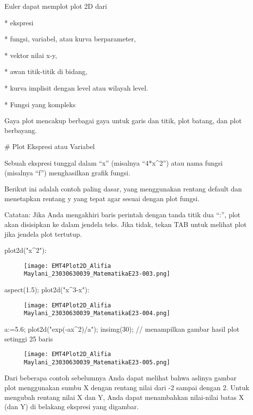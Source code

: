 \documentclass{article}
\begin{document}
Euler dapat memplot plot 2D dari


* 
ekspresi

* 
fungsi, variabel, atau kurva berparameter,

* 
vektor nilai x-y,

* 
awan titik-titik di bidang,

* 
kurva implisit dengan level atau wilayah level.

* 
Fungsi yang kompleks


Gaya plot mencakup berbagai gaya untuk garis dan titik, plot batang,
dan plot berbayang.


# Plot Ekspresi atau Variabel

Sebuah ekspresi tunggal dalam “x” (misalnya “4*x^2”) atau nama fungsi
(misalnya “f”) menghasilkan grafik fungsi.


Berikut ini adalah contoh paling dasar, yang menggunakan rentang
default dan menetapkan rentang y yang tepat agar sesuai dengan plot
fungsi.


Catatan: Jika Anda mengakhiri baris perintah dengan tanda titik dua
“:”, plot akan disisipkan ke dalam jendela teks. Jika tidak, tekan TAB
untuk melihat plot jika jendela plot tertutup.


\>plot2d("x^2"):


\begin{figure}
    \centering
    \texttt{[image: EMT4Plot2D\_Alifia Maylani\_23030630039\_MatematikaE23-003.png]}
    \caption{}
    \label{fig:enter-label}
\end{figure}

\>aspect(1.5); plot2d("x^3-x"):


\begin{figure}
    \centering
    \texttt{[image: EMT4Plot2D\_Alifia Maylani\_23030630039\_MatematikaE23-004.png]}
    \caption{}
    \label{fig:enter-label}
\end{figure}

\>a:=5.6; plot2d("exp(-a\*x^2)/a"); insimg(30); // menampilkan gambar hasil plot setinggi 25 baris


\begin{figure}
    \centering
    \texttt{[image: EMT4Plot2D\_Alifia Maylani\_23030630039\_MatematikaE23-005.png]}
    \caption{}
    \label{fig:enter-label}
\end{figure}

Dari beberapa contoh sebelumnya Anda dapat melihat bahwa aslinya
gambar plot menggunakan sumbu X dengan rentang nilai dari -2 sampai
dengan 2. Untuk mengubah rentang nilai X dan Y, Anda dapat menambahkan
nilai-nilai batas X (dan Y) di belakang ekspresi yang digambar.
\end{document}
